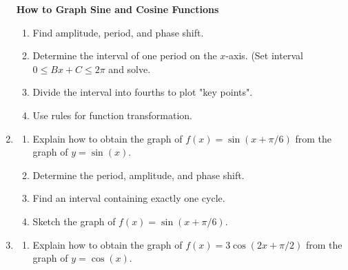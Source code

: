 \begin{enumerate}
\vfill
\textbf{How to Graph Sine and Cosine Functions}
\begin{enumerate}
\item Find amplitude, period, and phase shift.
\item Determine the interval of one period on the $x$-axis. (Set interval $0\leq Bx+C \leq 2\pi$ and solve.
\item Divide the interval into fourths to plot "key points".
\item Use rules for function transformation.
\end{enumerate}
\vfill


\newpage

\item \begin{enumerate} \item Explain how to obtain the graph of $f(x)=\sin(x+\pi/6)$ from the graph of $y=\sin(x)$. \\[.75in]

\item Determine the period, amplitude, and phase shift.\\[1.5in]

\item Find an interval containing exactly one cycle.\vfill

\item Sketch the graph of $f(x)=\sin(x+\pi/6)$. 
\end{enumerate} 



\newpage

\item \begin{enumerate} \item Explain how to obtain the graph of $f(x)=3\cos(2x+\pi/2)$ from the graph of $y=\cos(x)$. \\[.75in]


\end{enumerate}
\end{enumerate}

